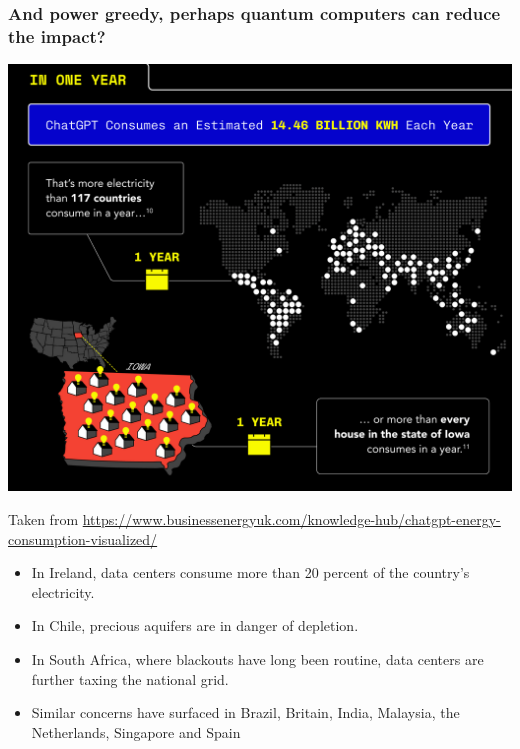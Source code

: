 \documentclass{beamer}
\begin{document}
\begin{frame}
\frametitle{And power greedy, perhaps quantum computers can reduce the impact?}

\centerline{\includegraphics[width=0.7\linewidth]{figures/aitalk1.png}}
Taken from \url{https://www.businessenergyuk.com/knowledge-hub/chatgpt-energy-consumption-visualized/}
\end{frame}

\begin{frame}
\begin{itemize}
\item In Ireland, data centers consume more than 20 percent of the country’s electricity.
\item In Chile, precious aquifers are in danger of depletion.
\item In South Africa, where blackouts have long been routine, data centers are further taxing the national grid.
\item Similar concerns have surfaced in Brazil, Britain, India, Malaysia, the Netherlands, Singapore and Spain
\end{itemize}
\end{frame}
\end{document}
